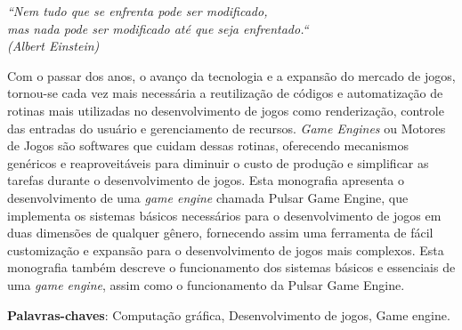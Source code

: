 \documentclass[12pt,	openright, twoside,	a4paper, english, french, spanish, brazil]{abntex2}
\begin{document}


\begin{epigrafe}
    \vspace*{\fill}
	\begin{flushright}
		\textit{``Nem tudo que se enfrenta pode ser modificado, \\ 
		mas nada pode ser modificado até que seja enfrentado.``\\ 
		(Albert Einstein)}
	\end{flushright}
\end{epigrafe}


\setlength{\absparsep}{18pt} %
\begin{resumo}
Com o passar dos anos, o avanço da tecnologia e a expansão do mercado de jogos, tornou-se cada vez mais necessária a reutilização de códigos e automatização de rotinas mais utilizadas no desenvolvimento de jogos como renderização, controle das entradas do usuário e gerenciamento de recursos.
\textit{Game Engines} ou Motores de Jogos são softwares que cuidam dessas rotinas, oferecendo mecanismos genéricos e reaproveitáveis para diminuir o custo de produção e simplificar as tarefas durante o desenvolvimento de jogos. 
Esta monografia apresenta o desenvolvimento de uma \textit{game engine} chamada Pulsar Game Engine, que implementa os sistemas básicos necessários para o desenvolvimento de jogos em duas dimensões de qualquer gênero, fornecendo assim uma ferramenta de fácil customização e expansão para o desenvolvimento de jogos mais complexos. Esta monografia também descreve o funcionamento dos sistemas básicos e essenciais de uma \textit{game engine}, assim como o funcionamento da Pulsar Game Engine.

 \textbf{Palavras-chaves}: Computação gráfica, Desenvolvimento de jogos, Game engine.
\end{resumo}
\end{document}
